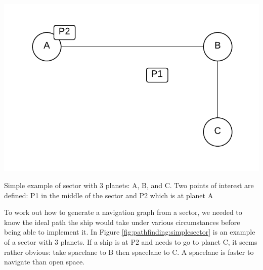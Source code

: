 \begin{marginfigure}
	\includegraphics{res/pathfinding/PathFindingSector.pdf}
	\caption[Simple example of sector]{Simple example of sector with 3 planets: A, B, and C. Two points of interest are defined: P1 in the middle of the sector and P2 which is at planet A}
	\label{fig:pathfinding:simplesector}
\end{marginfigure}

To work out how to generate a navigation graph from a sector, we needed to know the ideal path the ship would take under various circumstances before being able to implement it.
In Figure \ref{fig:pathfinding:simplesector} is an example of a sector with 3 planets.
If a ship is at P2 and needs to go to planet C, it seems rather obvious: take spacelane to B then spacelane to C. 
A spacelane is faster to navigate than open space.

